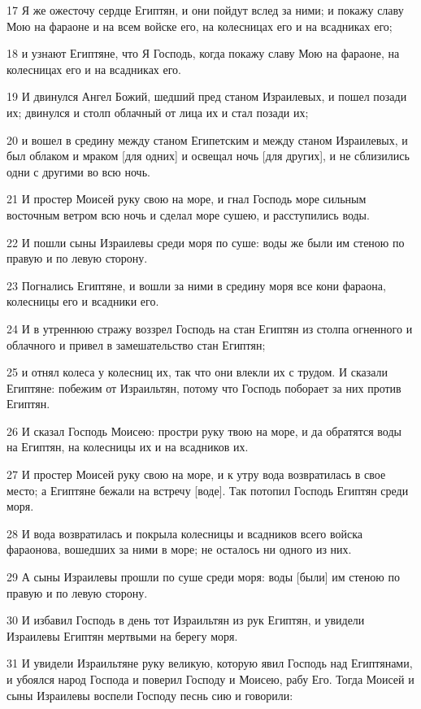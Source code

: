 \par 17 Я же ожесточу сердце Египтян, и они пойдут вслед за ними; и покажу славу Мою на фараоне и на всем войске его, на колесницах его и на всадниках его;
\par 18 и узнают Египтяне, что Я Господь, когда покажу славу Мою на фараоне, на колесницах его и на всадниках его.
\par 19 И двинулся Ангел Божий, шедший пред станом Израилевых, и пошел позади их; двинулся и столп облачный от лица их и стал позади их;
\par 20 и вошел в средину между станом Египетским и между станом Израилевых, и был облаком и мраком [для одних] и освещал ночь [для других], и не сблизились одни с другими во всю ночь.
\par 21 И простер Моисей руку свою на море, и гнал Господь море сильным восточным ветром всю ночь и сделал море сушею, и расступились воды.
\par 22 И пошли сыны Израилевы среди моря по суше: воды же были им стеною по правую и по левую сторону.
\par 23 Погнались Египтяне, и вошли за ними в средину моря все кони фараона, колесницы его и всадники его.
\par 24 И в утреннюю стражу воззрел Господь на стан Египтян из столпа огненного и облачного и привел в замешательство стан Египтян;
\par 25 и отнял колеса у колесниц их, так что они влекли их с трудом. И сказали Египтяне: побежим от Израильтян, потому что Господь поборает за них против Египтян.
\par 26 И сказал Господь Моисею: простри руку твою на море, и да обратятся воды на Египтян, на колесницы их и на всадников их.
\par 27 И простер Моисей руку свою на море, и к утру вода возвратилась в свое место; а Египтяне бежали на встречу [воде]. Так потопил Господь Египтян среди моря.
\par 28 И вода возвратилась и покрыла колесницы и всадников всего войска фараонова, вошедших за ними в море; не осталось ни одного из них.
\par 29 А сыны Израилевы прошли по суше среди моря: воды [были] им стеною по правую и по левую сторону.
\par 30 И избавил Господь в день тот Израильтян из рук Египтян, и увидели Израилевы Египтян мертвыми на берегу моря.
\par 31 И увидели Израильтяне руку великую, которую явил Господь над Египтянами, и убоялся народ Господа и поверил Господу и Моисею, рабу Его. Тогда Моисей и сыны Израилевы воспели Господу песнь сию и говорили:


